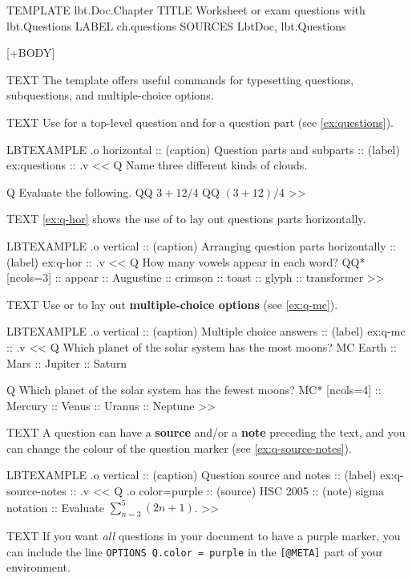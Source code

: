 
\begin{lbt}
  [@META]
    TEMPLATE  lbt.Doc.Chapter
    TITLE     Worksheet or exam questions with lbt.Questions
    LABEL     ch.questions
    SOURCES   LbtDoc, lbt.Questions

  [+BODY]

    TEXT The  template offers useful commands for typesetting questions, subquestions, and multiple-choice options.

    TEXT Use  for a top-level question and  for a question part (see \cref{ex:questions}).

    LBTEXAMPLE .o horizontal
    :: (caption) Question parts and subparts
    :: (label) ex:questions
    :: .v <<
      Q Name three different kinds of clouds.

      Q Evaluate the following.
      QQ $3 + 12 / 4$
      QQ $(3 + 12) / 4$
    >>

    TEXT \cref{ex:q-hor} shows the use of  to lay out questions parts horizontally.

    LBTEXAMPLE .o vertical
    :: (caption) Arranging question parts horizontally
    :: (label) ex:q-hor
    :: .v <<
      Q How many vowels appear in each word?
      QQ* [ncols=3]
      :: appear :: Augustine :: crimson :: toast :: glyph :: transformer
    >>

    TEXT Use  or  to lay out \textbf{multiple-choice options} (see \cref{ex:q-mc}).

    LBTEXAMPLE .o vertical
    :: (caption) Multiple choice answers
    :: (label) ex:q-mc
    :: .v <<
      Q Which planet of the solar system has the most moons?
      MC Earth :: Mars :: Jupiter :: Saturn

      Q Which planet of the solar system has the fewest moons?
      MC* [ncols=4] :: Mercury :: Venus :: Uranus :: Neptune
    >>

    TEXT A question can have a \textbf{source} and/or a \textbf{note} preceding the text, and you can change the colour of the question marker (see \cref{ex:q-source-notes}).

    LBTEXAMPLE .o vertical
    :: (caption) Question source and notes
    :: (label) ex:q-source-notes
    :: .v <<
      Q .o color=purple :: (source) HSC 2005 :: (note) sigma notation
      :: Evaluate $\displaystyle \sum_{n=3}^5 (2n+1)$.
    >>

    TEXT If you want \emph{all} questions in your document to have a purple marker, you can include the line \texttt{OPTIONS  Q.color = purple} in the \texttt{[@META]} part of your \lbtlogo{} environment.

\end{lbt}
